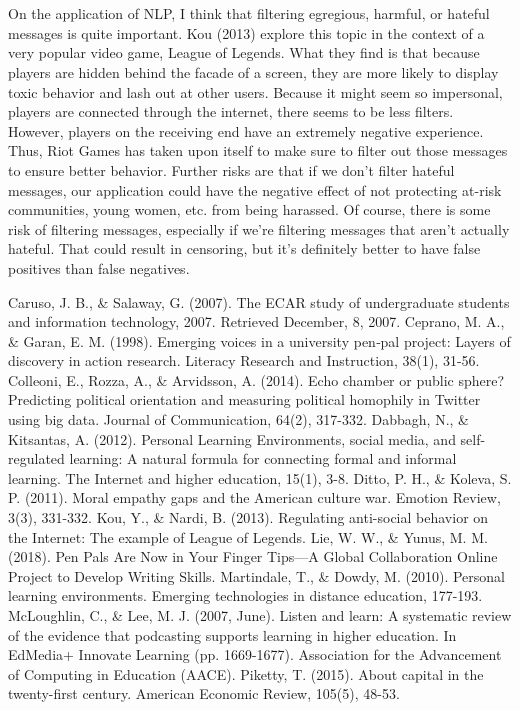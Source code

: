 \documentclass[12pt, final]{article}
\begin{document}
\\
\\
On the application of NLP, I think that filtering egregious, harmful, or hateful messages is quite important. Kou (2013) explore this topic in the context of a very popular video game, League of Legends. What they find is that because players are hidden behind the facade of a screen, they are more likely to display toxic behavior and lash out at other users. Because it might seem so impersonal, players are connected through the internet, there seems to be less filters. However, players on the receiving end have an extremely negative experience. Thus, Riot Games has taken upon itself to make sure to filter out those messages to ensure better behavior. Further risks are that if we don't filter hateful messages, our application could have the negative effect of not protecting at-risk communities, young women, etc. from being harassed. Of course, there is some risk of filtering messages, especially if we're filtering messages that aren't actually hateful. That could result in censoring, but it's definitely better to have false positives than false negatives. 

  \begin{thebibliography}{1}
   Caruso, J. B., \& Salaway, G. (2007). The ECAR study of undergraduate students and information technology, 2007. Retrieved December, 8, 2007.
   Ceprano, M. A., \& Garan, E. M. (1998). Emerging voices in a university pen‐pal project: Layers of discovery in action research. Literacy Research and Instruction, 38(1), 31-56.
   Colleoni, E., Rozza, A., \& Arvidsson, A. (2014). Echo chamber or public sphere? Predicting political orientation and measuring political homophily in Twitter using big data. Journal of Communication, 64(2), 317-332.
   Dabbagh, N., \& Kitsantas, A. (2012). Personal Learning Environments, social media, and self-regulated learning: A natural formula for connecting formal and informal learning. The Internet and higher education, 15(1), 3-8.
   Ditto, P. H., \& Koleva, S. P. (2011). Moral empathy gaps and the American culture war. Emotion Review, 3(3), 331-332.
  Kou, Y., \& Nardi, B. (2013). Regulating anti-social behavior on the Internet: The example of League of Legends.
   Lie, W. W., \& Yunus, M. M. (2018). Pen Pals Are Now in Your Finger Tips—A Global Collaboration Online Project to Develop Writing Skills.
   Martindale, T., \& Dowdy, M. (2010). Personal learning environments. Emerging technologies in distance education, 177-193.
   McLoughlin, C., \& Lee, M. J. (2007, June). Listen and learn: A systematic review of the evidence that podcasting supports learning in higher education. In EdMedia+ Innovate Learning (pp. 1669-1677). Association for the Advancement of Computing in Education (AACE).
   Piketty, T. (2015). About capital in the twenty-first century. American Economic Review, 105(5), 48-53.
  \end{thebibliography}
\end{document}
